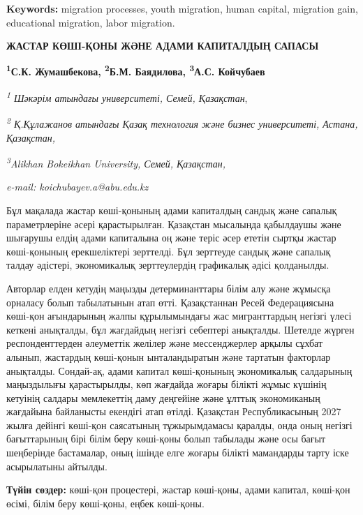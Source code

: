 {\bfseries Keywords:} migration processes, youth migration, human capital,
migration gain, educational migration, labor migration.

\begin{articleheader}
{\bfseries ЖАСТАР КӨШІ-ҚОНЫ ЖӘНЕ АДАМИ КАПИТАЛДЫҢ САПАСЫ}

{\bfseries
\textsuperscript{1}С.К. Жумашбекова,
\textsuperscript{2}Б.М. Баядилова,
\textsuperscript{3}А.С. Койчубаев\textsuperscript{\envelope }}
\end{articleheader}

\begin{affiliation}
\emph{\textsuperscript{1} Шәкәрім атындағы университеті, Семей, Қазақстан},

\emph{\textsuperscript{2} Қ.Құлажанов атындағы Қазақ технология және бизнес университеті, Астана, Қазақстан,}

\emph{\textsuperscript{3}Alikhan Bokeikhan University, Семей, Қазақстан,}

\emph{e-mail: koichubayev.a@abu.edu.kz}
\end{affiliation}

Бұл мақалада жастар көші-қонының адами капиталдың сандық және сапалық
параметрлеріне әсері қарастырылған. Қазақстан мысалында қабылдаушы және
шығарушы елдің адами капиталына оң және теріс әсер ететін сыртқы жастар
көші-қонының ерекшеліктері зерттелді. Бұл зерттеуде сандық және сапалық
талдау әдістері, экономикалық зерттеулердің графикалық әдісі қолданылды.

Авторлар елден кетудің маңызды детерминанттары білім алу және жұмысқа
орналасу болып табылатынын атап өтті. Қазақстаннан Ресей Федерациясына
көші-қон ағындарының жалпы құрылымындағы жас мигранттардың негізгі үлесі
кеткені анықталды, бұл жағдайдың негізгі себептері анықталды. Шетелде
жүрген респонденттерден әлеуметтік желілер және мессенджерлер арқылы
сұхбат алынып, жастардың көші-қонын ынталандыратын және тартатын
факторлар анықталды. Сондай-ақ, адами капитал көші-қонының экономикалық
салдарының маңыздылығы қарастырылды, көп жағдайда жоғары білікті жұмыс
күшінің кетуінің салдары мемлекеттің даму деңгейіне және ұлттық
экономиканың жағдайына байланысты екендігі атап өтілді. Қазақстан
Республикасының 2027 жылға дейінгі көші-қон саясатының тұжырымдамасы
қаралды, онда оның негізгі бағыттарының бірі білім беру көші-қоны болып
табылады және осы бағыт шеңберінде бастамалар, оның ішінде елге жоғары
білікті мамандарды тарту іске асырылатыны айтылды.

{\bfseries Түйін сөздер:} көші-қон процестері, жастар көші-қоны, адами
капитал, көші-қон өсімі, білім беру көші-қоны, еңбек көші-қоны.

